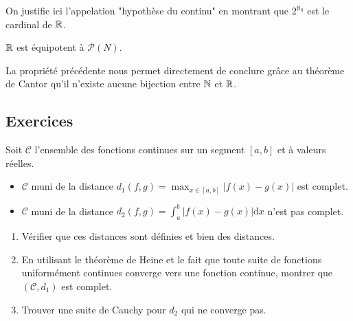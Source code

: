 On justifie ici l'appelation "hypothèse du continu" en montrant que $2^{\aleph_0}$ est le cardinal de $\mathbb{R}$.

\begin{theoreme}
    $\mathbb{R}$ est équipotent à $\mathcal{P}(N)$.
    \tcblower
\end{theoreme}

\begin{theoreme}
    La propriété précédente nous permet directement de conclure grâce au théorème de Cantor qu'il n'existe aucune bijection entre $\mathbb{N}$ et $\mathbb{R}$. 
\end{theoreme}

\subsection*{Exercices}

\setcounter{exo}{0}

\begin{exo}
    Soit $\mathcal{C}$ l'ensemble des fonctions continues sur un segment $[a,b]$ et à valeurs réelles.
    \begin{itemize}
        \item $\mathcal{C}$ muni de la distance $d_1(f,g)=\max_{x\in [a,b]} |f(x)-g(x)|$ est complet.
        \item $\mathcal{C}$ muni de la distance $d_2(f,g)=\int_a^b|f(x)-g(x)| \mathrm{d}x$ n'est pas complet. 
    \end{itemize}
    \tcblower
    \begin{enumerate}
        \item Vérifier que ces distances sont définies et bien des distances.
        \item En utilisant le théorème de Heine et le fait que toute suite de fonctions uniformément continues converge vers une fonction continue, montrer que $(\mathcal{C},d_1)$ est complet.
        \item Trouver une suite de Cauchy pour $d_2$ qui ne converge pas.
    \end{enumerate}
\end{exo}